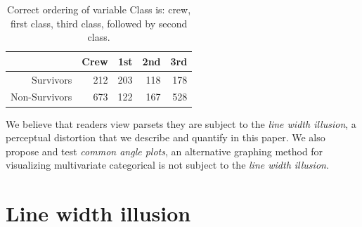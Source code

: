 \begin{table}
\begin{center}
\begin{tabular}{rrrrr}
& Crew & 1st & 2nd & 3rd \\ \hline
Survivors & 212 & 203 & 118 & 178\\
Non-Survivors & 673 & 122 & 167 &  528  
\end{tabular}
\caption{Correct ordering of variable Class is: crew, first class, third class, followed by second class. }
\end{center}
\end{table}
We believe that readers view parsets they are subject to the \emph{line width illusion}, a perceptual distortion that we describe and quantify in this paper. We also propose and test \emph{common angle plots}, an alternative graphing method for visualizing multivariate categorical is not subject to the \emph{line width illusion}.


%

\section{Line width illusion}




